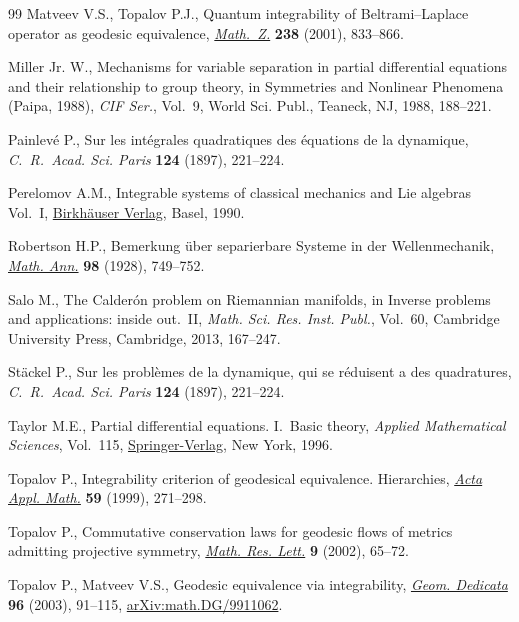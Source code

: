 \documentclass[pdftex]{sigma}
\numberwithin{equation}{section}
\begin{document}
\begin{thebibliography}{99}
Matveev V.S., Topalov P.J., Quantum integrability of {B}eltrami--{L}aplace
 operator as geodesic equivalence, \href{https://doi.org/10.1007/s002090100280}{\textit{Math.~Z.}} \textbf{238} (2001),
 833--866.

Miller Jr. W., Mechanisms for variable separation in partial differential
 equations and their relationship to group theory, in Symmetries and Nonlinear
 Phenomena ({P}aipa, 1988), \textit{CIF Ser.}, Vol.~9, World Sci. Publ.,
 Teaneck, NJ, 1988, 188--221.

Painlev\'e P., Sur les int{\'e}grales quadratiques des \'equations de la
 dynamique, \textit{C.~R.~Acad. Sci. Paris} \textbf{124} (1897), 221--224.

Perelomov A.M., Integrable systems of classical mechanics and {L}ie algebras~
 {V}ol.~{I}, \href{https://doi.org/10.1007/978-3-0348-9257-5}{Birkh\"{a}user Verlag}, Basel, 1990.

Robertson H.P., Bemerkung \"{u}ber separierbare {S}ysteme in der
 {W}ellenmechanik, \href{https://doi.org/10.1007/BF01451624}{\textit{Math. Ann.}} \textbf{98} (1928), 749--752.

Salo M., The {C}alder\'{o}n problem on {R}iemannian manifolds, in Inverse
 problems and applications: inside out.~{II}, \textit{Math. Sci. Res. Inst.
 Publ.}, Vol.~60, Cambridge University Press, Cambridge, 2013, 167--247.

St\"ackel P., Sur les probl\`emes de la dynamique, qui se r\'eduisent a des
 quadratures, \textit{C.~R.~Acad. Sci. Paris} \textbf{124} (1897), 221--224.

Taylor M.E., Partial differential equations. {I}.~{B}asic theory,
 \textit{Applied Mathematical Sciences}, Vol.~115, \href{https://doi.org/10.1007/978-1-4684-9320-7}{Springer-Verlag}, New York,
 1996.

Topalov P., Integrability criterion of geodesical equivalence. {H}ierarchies,
 \href{https://doi.org/10.1023/A:1006369525091}{\textit{Acta Appl. Math.}} \textbf{59} (1999), 271--298.

Topalov P., Commutative conservation laws for geodesic flows of metrics
 admitting projective symmetry, \href{https://doi.org/10.4310/MRL.2002.v9.n1.a5}{\textit{Math. Res. Lett.}} \textbf{9} (2002),
 65--72.

Topalov P., Matveev V.S., Geodesic equivalence via integrability, \href{https://doi.org/10.1023/A:1022166218282}{\textit{Geom.
 Dedicata}} \textbf{96} (2003), 91--115, \href{https://arxiv.org/abs/math.DG/9911062}{arXiv:math.DG/9911062}.


\end{thebibliography}
\end{document}
